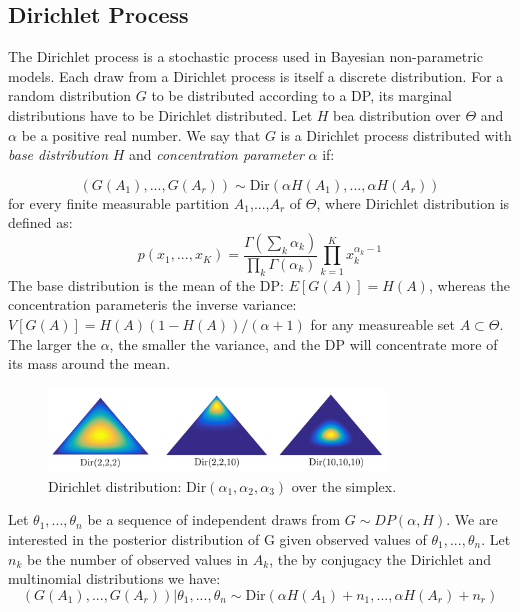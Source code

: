 
\subsection{Dirichlet Process}

The Dirichlet process is a stochastic process used in Bayesian non-parametric models. Each draw from a Dirichlet process is itself a discrete distribution. For a random distribution $G$ to be distributed according to a DP, its marginal distributions have to be Dirichlet distributed. Let $H$ bea distribution over $\Theta$ and $\alpha$ be a positive real number. We say that $G$ is a Dirichlet process distributed with \textit{base distribution} $H$ and \textit{concentration parameter} $\alpha$ if:

\begin{equation}
    (G(A_1),...,G(A_r)) \sim \mathrm{Dir}(\alpha H(A_1),...,\alpha H(A_r))
\end{equation}
for every finite measurable partition $A_1$,...,$A_r$ of $\Theta$, where Dirichlet distribution is defined as:
\begin{equation}
    p(x_1,...,x_K) = \frac{\Gamma(\sum_k \alpha_k)}{\prod_k \Gamma(\alpha_k)}\prod_{k=1}^{K}x_{k}^{\alpha_k-1}
\end{equation}
The base distribution is the mean of the DP: $E[G(A)] = H(A)$, whereas the concentration parameteris the inverse variance: $V[G(A)] = H(A)(1-H(A))/(\alpha+1)$ for any measureable set $A\subset \Theta$. The larger the $\alpha$, the smaller the variance, and the DP will concentrate more of its mass around the mean.
\begin{figure}[tbhp]
    \centering
    \includegraphics[width=0.8\textwidth, trim={10 10 10 10}]{figures/dir_merged.png}
    \caption{Dirichlet distribution: $\mathrm{Dir}(\alpha_1,\alpha_2,\alpha_3)$ over the simplex.}
    \label{fig:dir_merged}
\end{figure}
Let $\theta_1,...,\theta_n$ be a sequence of independent draws from $G\sim DP(\alpha,H)$. We are interested in the posterior distribution of G given observed values of $\theta_1,...,\theta_n$. Let $n_k$ be the number of observed values in $A_k$, the by conjugacy the Dirichlet and multinomial distributions we have:
\begin{equation}
    (G(A_1),...,G(A_r))|\theta_1,...,\theta_n \sim \mathrm{Dir}(\alpha H(A_1)+n_1,...,\alpha H(A_r)+n_r)
\end{equation}
